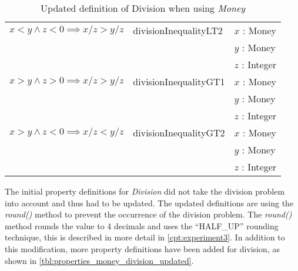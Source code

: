 \begin{table}[!ht]
\begin{tabular}{lll}
\rowcolor[HTML]{EFEFEF} $x < y \land z < 0 \implies x / z > y / z$              & divisionInequalityLT2  & $x$ : Money              \\
\rowcolor[HTML]{EFEFEF}                                                         &                        & $y$ : Money              \\
\rowcolor[HTML]{EFEFEF}                                                         &                        & $z$ : Integer            \\
												$x > y \land z > 0 \implies x / z > y / z$              & divisionInequalityGT1  & $x$ : Money              \\
                                                                                &                        & $y$ : Money              \\
                                                                                &                        & $z$ : Integer            \\
\rowcolor[HTML]{EFEFEF} $x > y \land z < 0 \implies x / z < y / z$              & divisionInequalityGT2  & $x$ : Money              \\
\rowcolor[HTML]{EFEFEF}                                                         &                        & $y$ : Money              \\
\rowcolor[HTML]{EFEFEF}                                                         &                        & $z$ : Integer            \\ \hline
\end{tabular}
\caption{Updated definition of Division when using \textit{Money}}
\label{tbl:properties_money_division_updated}
\end{table}
\FloatBarrier\noindent
The initial property definitions for \textit{Division} did not take the division
problem into account and thus had to be updated. The updated definitions are
using the \textit{round()} method to prevent the occurrence of the division
problem. The \textit{round()} method rounds the value to 4 decimals and uses the
``HALF\_UP'' rounding technique, this is described in more detail in \autoref{cpt:experiment3}.
In addition to this modification, more property
definitions have been added for division, as shown in
\autoref{tbl:properties_money_division_updated}.
\clearpage %
